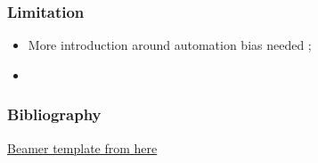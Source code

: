 \documentclass[compress,12pt]{beamer}
\begin{document}
\begin{frame}
      \frametitle{Limitation}
      \begin{itemize}
            \item More introduction around automation bias needed ;
            \item 
      \end{itemize}
\end{frame}



\End
\begin{frame}
      \frametitle{Bibliography}
      \footnotesize{
            
            
            \href{https://github.com/piazzai/arguelles}{Beamer template from here \faGithub} \\
      }
\end{frame}
\end{document}
